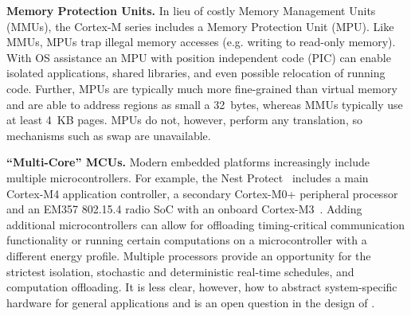 
{\bf Memory Protection Units.}
In lieu of costly Memory Management Units (MMUs), the Cortex-M series includes
a Memory Protection Unit (MPU). Like MMUs, MPUs trap illegal memory accesses
(e.g. writing to read-only memory).
With OS assistance an MPU
with position independent code (PIC) can enable isolated applications, shared
libraries, and even possible relocation of running code.
Further, MPUs are typically much more fine-grained than
virtual memory and are able to address regions as small a 32~bytes, whereas MMUs
typically use at least 4~KB pages.
MPUs do not, however, perform any translation, so mechanisms such as swap are unavailable.

{\bf ``Multi-Core'' MCUs.}
Modern embedded platforms increasingly include multiple microcontrollers.
For example, the Nest
Protect~\cite{nestprotect} includes a main Cortex-M4 application controller, a secondary
Cortex-M0+ peripheral processor and an EM357 802.15.4 radio SoC with an
onboard Cortex-M3~\cite{nestprotect-teardown}.
Adding additional microcontrollers can allow for offloading timing-critical
communication functionality or running certain computations on a microcontroller
with a different energy profile.
Multiple
processors provide an opportunity for
the strictest isolation, stochastic and deterministic real-time schedules, and
computation offloading. It is less clear, however, how to abstract
system-specific hardware for general applications and is an open question in
the design of \name.







